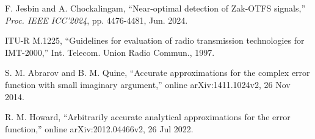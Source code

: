 \begin{thebibliography}{99}
\vspace{-2mm}
F. Jesbin and A. Chockalingam, ``Near-optimal detection of Zak-OTFS signals,'' {\it Proc. IEEE ICC'2024},  pp. 4476-4481, Jun. 2024.

\vspace{-2mm}
ITU-R M.1225, ``Guidelines for evaluation of radio transmission technologies for IMT-2000,'' Int. Telecom. Union Radio Commun., 1997. 

\vspace{-2mm}
S. M. Abrarov and B. M. Quine, ``Accurate approximations for the complex error function with small imaginary argument,'' online arXiv:1411.1024v2, 26 Nov 2014.

\vspace{-2mm}
R. M. Howard, ``Arbitrarily accurate analytical approximations for the error function,'' online arXiv:2012.04466v2, 26 Jul 2022.

\end{thebibliography}
